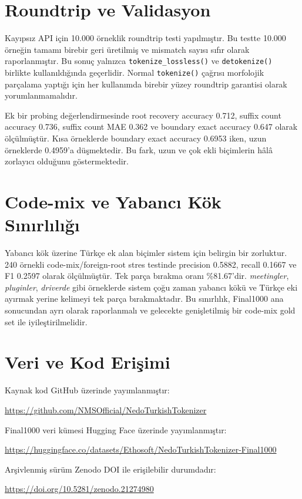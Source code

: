 \documentclass[11pt]{article}
\begin{document}
\section{Roundtrip ve Validasyon}
Kayıpsız API için 10.000 örneklik roundtrip testi yapılmıştır. Bu testte 10.000 örneğin tamamı birebir geri üretilmiş ve mismatch sayısı sıfır olarak raporlanmıştır. Bu sonuç yalnızca \texttt{tokenize\_lossless()} ve \texttt{detokenize()} birlikte kullanıldığında geçerlidir. Normal \texttt{tokenize()} çağrısı morfolojik parçalama yaptığı için her kullanımda birebir yüzey roundtrip garantisi olarak yorumlanmamalıdır.

Ek bir probing değerlendirmesinde root recovery accuracy 0.712, suffix count accuracy 0.736, suffix count MAE 0.362 ve boundary exact accuracy 0.647 olarak ölçülmüştür. Kısa örneklerde boundary exact accuracy 0.6953 iken, uzun örneklerde 0.4959'a düşmektedir. Bu fark, uzun ve çok ekli biçimlerin hâlâ zorlayıcı olduğunu göstermektedir.

\section{Code-mix ve Yabancı Kök Sınırlılığı}
Yabancı kök üzerine Türkçe ek alan biçimler sistem için belirgin bir zorluktur. 240 örnekli code-mix/foreign-root stres testinde precision 0.5882, recall 0.1667 ve F1 0.2597 olarak ölçülmüştür. Tek parça bırakma oranı \%81.67'dir. \emph{meetingler}, \emph{pluginler}, \emph{driverde} gibi örneklerde sistem çoğu zaman yabancı kökü ve Türkçe eki ayırmak yerine kelimeyi tek parça bırakmaktadır. Bu sınırlılık, Final1000 ana sonucundan ayrı olarak raporlanmalı ve gelecekte genişletilmiş bir code-mix gold set ile iyileştirilmelidir.

\section{Veri ve Kod Erişimi}
Kaynak kod GitHub üzerinde yayımlanmıştır:
\begin{center}
\url{https://github.com/NMSOfficial/NedoTurkishTokenizer}
\end{center}

Final1000 veri kümesi Hugging Face üzerinde yayımlanmıştır:
\begin{center}
\url{https://huggingface.co/datasets/Ethosoft/NedoTurkishTokenizer-Final1000}
\end{center}

Arşivlenmiş sürüm Zenodo DOI ile erişilebilir durumdadır:
\begin{center}
\url{https://doi.org/10.5281/zenodo.21274980}
\end{center}
\end{document}
